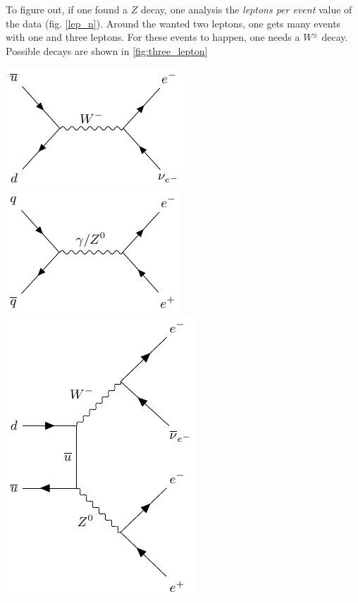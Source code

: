 \documentclass[12pt, a4paper, bibliography=totoc]{scrartcl}
\begin{document}
\begin{multicols}{2}
To figure out, if one found a $Z$ decay, one analysis the \textit{leptons per event} value of the data (fig. \ref{lep_n}).
Around the wanted two leptons, one gets many events with one and three leptons. 
For these events to happen, one needs a $W^{\pm}$ decay.
Possible decays are shown in \ref{fig:three_lepton}
    \begin{center}
        \includegraphics[width=0.45\linewidth]{fig/feynman_1.pdf} \hfill
        \includegraphics[width=0.45\linewidth]{fig/feynman_2.pdf} \\
        \includegraphics[width=0.45\linewidth]{fig/feynman_3.pdf}
\label{fig:three_lepton}
\end{center}


\end{multicols}
\end{document}
